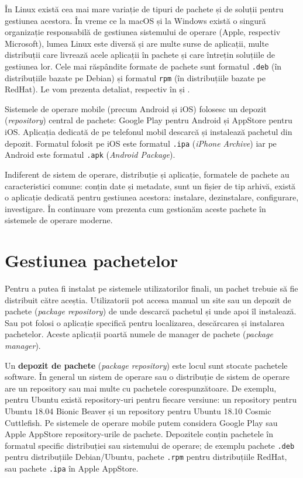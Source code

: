 În Linux există cea mai mare variație de tipuri de pachete și de soluții pentru gestiunea acestora. În vreme ce la macOS și la Windows există o singură organizație responsabilă de gestiunea sistemului de operare (Apple, respectiv Microsoft), lumea Linux este diversă și are multe surse de aplicații, multe distribuții care livrează acele aplicații în pachete și care întrețin soluțiile de gestiunea lor. Cele mai răspândite formate de pachete sunt formatul \texttt{.deb} (în distribuțiile bazate pe Debian) și formatul \texttt{rpm} (în distribuțiile bazate pe RedHat). Le vom prezenta detaliat, respectiv în  și .

Sistemele de operare mobile (precum Android și iOS) folosesc un depozit (\textit{repository}) central de pachete: Google Play pentru Android și AppStore pentru iOS. Aplicația dedicată de pe telefonul mobil descarcă și instalează pachetul din depozit. Formatul folosit pe iOS este formatul \texttt{.ipa} (\textit{iPhone Archive}) iar pe Android este formatul \texttt{.apk} (\textit{Android Package}).

Indiferent de sistem de operare, distribuție și aplicație, formatele de pachete au caracteristici comune: conțin date și metadate, sunt un fișier de tip arhivă, există o aplicație dedicată pentru gestiunea acestora: instalare, dezinstalare, configurare, investigare. În continuare vom prezenta cum gestionăm aceste pachete în sistemele de operare moderne.

\section{Gestiunea pachetelor}
\label{sec:package:manage}

Pentru a putea fi instalat pe sistemele utilizatorilor finali, un pachet trebuie să fie distribuit către aceștia. Utilizatorii pot accesa manual un site sau un depozit de pachete (\textit{package repository}) de unde descarcă pachetul și unde apoi îl instalează. Sau pot folosi o aplicație specifică pentru localizarea, descărcarea și instalarea pachetelor. Aceste aplicații poartă numele de manager de pachete (\textit{package manager}).

Un \textbf{depozit de pachete} (\textit{package repository}) este locul sunt stocate pachetele software. În general un sistem de operare sau o distribuție de sistem de operare are un repository sau mai multe cu pachetele corespunzătoare. De exemplu, pentru Ubuntu există repository-uri pentru fiecare versiune: un repository pentru Ubuntu 18.04 Bionic Beaver și un repository pentru Ubuntu 18.10 Cosmic Cuttlefish. Pe sistemele de operare mobile putem considera Google Play sau Apple AppStore repository-urile de pachete. Depozitele conțin pachetele în formatul specific distribuției sau sistemului de operare; de exemplu pachete \texttt{.deb} pentru distribuțiile Debian/Ubuntu, pachete \texttt{.rpm} pentru distribuțiile RedHat, sau pachete \texttt{.ipa} în Apple AppStore.


